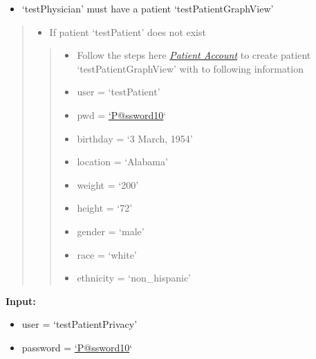 \documentclass[letterpaper,10pt,english]{sphinxmanual}
\begin{document}
\begin{itemize}
\item {} 
`testPhysician' must have a patient `testPatientGraphView'

\end{itemize}
\begin{quote}
\begin{itemize}
\item {} 
If patient `testPatient' does not exist

\end{itemize}
\begin{quote}
\begin{itemize}
\item {} 
Follow the steps here {\hyperref[user_guide/account_creation:create-patient-account]{\emph{Patient Account}}} to create patient `testPatientGraphView' with to following information

\end{itemize}
\begin{itemize}
\item {} 
user = `testPatient'

\item {} 
pwd = \href{mailto:'P@ssword10}{`P@ssword10}`

\item {} 
birthday = `3 March, 1954'

\item {} 
location = `Alabama'

\item {} 
weight = `200'

\item {} 
height = `72'

\item {} 
gender = `male'

\item {} 
race = `white'

\item {} 
ethnicity = `non\_hispanic'

\end{itemize}
\end{quote}
\end{quote}

\textbf{Input:}
\begin{itemize}
\item {} 
user = `testPatientPrivacy'

\item {} 
password = \href{mailto:'P@ssword10}{`P@ssword10}`

\end{itemize}
\end{document}

